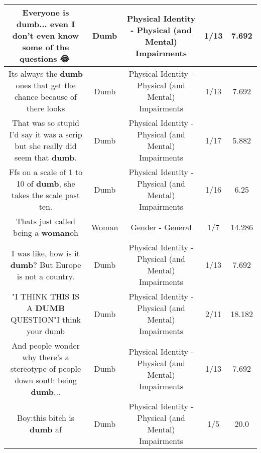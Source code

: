 \documentclass[11pt]{article}
\newlength\mylength
\begin{document}
\begin{center}
\begin{longtable}{|C{.65\mylength}|C{.30\mylength}|C{.12\mylength}|C{.12\mylength}|C{.12\mylength}|}
  \small Everyone is \textbf{dumb}... even I don't even know some of the questions 😂🤣\normalsize   & Dumb & Physical Identity - Physical (and Mental) Impairments & 1/13 & 7.692 \\  \hline
  \small Its always the \textbf{dumb} ones that get the chance because of there looks\normalsize   & Dumb & Physical Identity - Physical (and Mental) Impairments & 1/13 & 7.692 \\  \hline
  \small That was so stupid I'd say it was a scrip but she really did seem that \textbf{dumb}.\normalsize   & Dumb & Physical Identity - Physical (and Mental) Impairments & 1/17 & 5.882 \\  \hline
  \small Ffs on a scale of 1 to 10 of \textbf{dumb}, she takes the scale past ten.\normalsize   & Dumb & Physical Identity - Physical (and Mental) Impairments & 1/16 & 6.25 \\  \hline
  \small Thats just called being a \textbf{woman}oh\normalsize   & Woman & Gender - General & 1/7 & 14.286 \\  \hline
  \small I was like, how is it \textbf{dumb}? But Europe is not a country.\normalsize   & Dumb & Physical Identity - Physical (and Mental) Impairments & 1/13 & 7.692 \\  \hline
  \small "I THINK THIS IS A \textbf{DUMB} QUESTION"I think your dumb\normalsize   & Dumb & Physical Identity - Physical (and Mental) Impairments & 2/11 & 18.182 \\  \hline
  \small And people wonder why there's a stereotype of people down south being \textbf{dumb}...\normalsize   & Dumb & Physical Identity - Physical (and Mental) Impairments & 1/13 & 7.692 \\  \hline
  \small Boy:this bitch is \textbf{dumb} af\normalsize   & Dumb & Physical Identity - Physical (and Mental) Impairments & 1/5 & 20.0 \\  \hline

\end{longtable}
\end{center}
\end{document}
